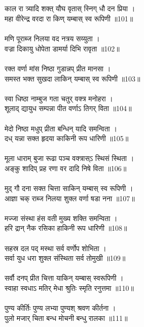 \subsection{}
काल रा त्र्यादि शक्त् यौघ वृतास् स्निग् धौ दन प्रिया ।\\
महा वीरेन्द्र वरदा रा किण् यम्बास् स्व रूपिणी ॥101॥\\
\\
मणि पूराब्ज निलया वद नत्रय सय्युता ।\\
वज्रा दिकायु धोपेता डामर्या दिभि रावृता ॥102॥\\
\\
रक्त वर्णा मांस निष्ठा गुडान्नप् प्रीत मानसा ।\\
समस्त भक्त सुखदा लाकिन् यम्बास् स्व रूपिणी ॥103॥\\
\\
स्वा धिष्ठा नाम्बुज गता चतुर् वक्त्र मनोहरा ।\\
शूलाद् द्यायुध सम्पन्ना पीत वर्णाऽ तिगर् विता ॥104॥\\
\\
मेदो निष्ठा मधुप् प्रीता बन्धिन् यादि समन्विता ।\\
दध् यन्ना सक्त हृदया काकिनी रूप धारिणी ॥105॥\\
\\
मूला धाराम् बुजा रूढा पञ्च वक्त्रास्ऽ स्थिसं स्थिता ।\\
अङ्कु शादिप् प्रह रणा वर दादि निषे विता ॥106॥\\
\\
मुद् गौ दना सक्त चित्ता साकिन् यम्बास् स्व रूपिणी ।\\
आज्ञा चक् राब्ज निलया शुक्ल वर्णा षडा नना ॥107॥\\
\\
मज्जा संस्था हंस वती मुख्य शक्ति समन्विता ।\\
हरि द्रान् नैक रसिका हाकिनी रूप धारिणी ॥108॥\\
\\
सहस्र दल पद् मस्था सर्व वर्णोप शोभिता ।\\
सर्वा युध धरा शुक्ल संस्थिता सर्व तोमुखी ॥109॥\\
\\
सर्वौ दनप् प्रीत चित्ता याकिन् यम्बास् स्वरूपिणी ।\\
स्वाहा स्वधाऽ मतिर् मेधा श्रुतिः स्मृति रनुत्तमा ॥110॥\\
\\
पुण्य कीर्तिः पुण्य लभ्या {\small{}} पुण्यश् श्रवण कीर्तना ।\\
पुलो मजार् चिता बन्ध मोचनी बन्धु रालका ॥111॥\\
